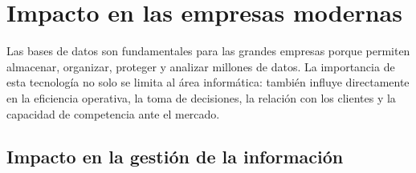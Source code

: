 \documentclass[12pt,a4paper]{article}
\begin{document}
\section{Impacto en las empresas modernas}

Las bases de datos son fundamentales para las grandes empresas porque permiten almacenar, organizar, proteger y analizar millones de datos. La importancia de esta tecnología no solo se limita al área informática: también influye directamente en la eficiencia operativa, la toma de decisiones, la relación con los clientes y la capacidad de competencia ante el mercado.

\subsection{Impacto en la gestión de la información}
\end{document}
